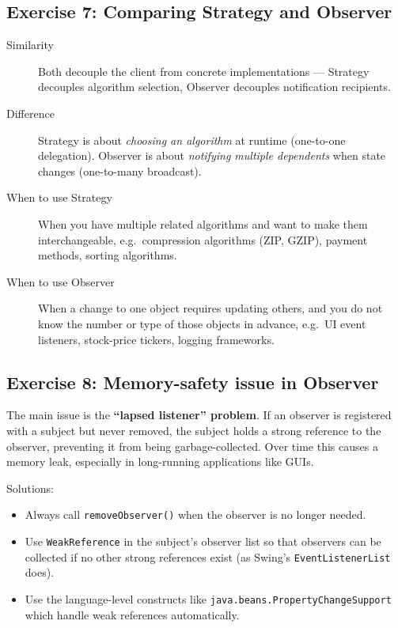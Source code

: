 \documentclass[twoside=false,DIV=14]{scrartcl}
\begin{document}
\subsection*{Exercise 7: Comparing Strategy and Observer}

\begin{description}
    \item[Similarity] Both decouple the client from concrete implementations --- Strategy decouples algorithm selection, Observer decouples notification recipients.
    \item[Difference] Strategy is about \emph{choosing an algorithm} at runtime (one-to-one delegation).  Observer is about \emph{notifying multiple dependents} when state changes (one-to-many broadcast).
    \item[When to use Strategy] When you have multiple related algorithms and want to make them interchangeable, e.g.\ compression algorithms (ZIP, GZIP), payment methods, sorting algorithms.
    \item[When to use Observer] When a change to one object requires updating others, and you do not know the number or type of those objects in advance, e.g.\ UI event listeners, stock-price tickers, logging frameworks.
\end{description}

\subsection*{Exercise 8: Memory-safety issue in Observer}

The main issue is the \textbf{``lapsed listener'' problem}.  If an observer is registered with a subject but never removed, the subject holds a strong reference to the observer, preventing it from being garbage-collected.  Over time this causes a memory leak, especially in long-running applications like GUIs.

Solutions:
\begin{itemize}
    \item Always call \texttt{removeObserver()} when the observer is no longer needed.
    \item Use \texttt{WeakReference} in the subject's observer list so that observers can be collected if no other strong references exist (as Swing's \texttt{EventListenerList} does).
    \item Use the language-level constructs like \texttt{java.beans.PropertyChangeSupport} which handle weak references automatically.
\end{itemize}
\end{document}
